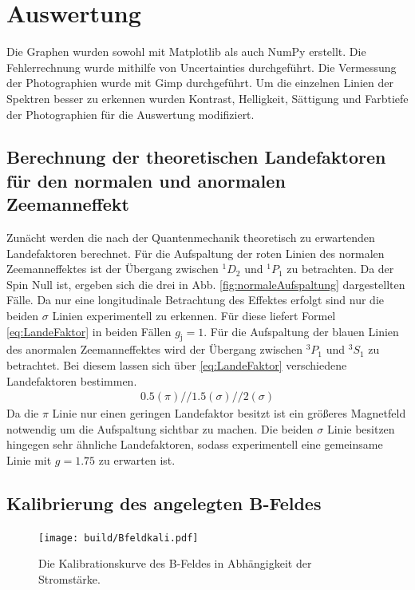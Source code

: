 \section{Auswertung}
\label{sec:Auswertung}
Die Graphen wurden sowohl mit Matplotlib \cite{matplotlib} als auch NumPy \cite{numpy} erstellt. Die
Fehlerrechnung wurde mithilfe von Uncertainties \cite{uncertainties} durchgeführt. Die Vermessung der Photographien wurde mit Gimp durchgeführt. Um die einzelnen Linien der Spektren besser zu erkennen wurden Kontrast, Helligkeit, Sättigung und Farbtiefe der Photographien für die Auswertung modifiziert.%



\subsection{Berechnung der theoretischen Landefaktoren für den normalen und anormalen Zeemanneffekt}
Zunächt werden die nach der Quantenmechanik theoretisch zu erwartenden Landefaktoren berechnet. Für die Aufspaltung der roten Linien des normalen Zeemanneffektes ist der Übergang zwischen $^1 D_2$ und $^1 P_1$ zu betrachten.
 Da der Spin Null ist, ergeben sich die drei in Abb. \ref{fig:normaleAufspaltung} dargestellten Fälle. Da nur eine longitudinale Betrachtung des Effektes erfolgt sind nur die beiden $\sigma$ Linien experimentell zu erkennen. Für diese liefert Formel \eqref{eq:LandeFaktor} in beiden Fällen $g_\text{j} = 1$.
Für die Aufspaltung der blauen Linien des anormalen Zeemanneffektes wird der Übergang zwischen $^3 P_1$ und $^3 S_1$ zu betrachtet. Bei diesem lassen sich über \eqref{eq:LandeFaktor} verschiedene Landefaktoren bestimmen. 
\begin{gather}
	0.5 (\pi)// 
	1.5 (\sigma)//
	2 (\sigma)
\end{gather}
Da die $\pi$ Linie nur einen geringen Landefaktor besitzt ist ein größeres Magnetfeld notwendig um die Aufspaltung sichtbar zu machen. Die beiden $\sigma$ Linie besitzen hingegen sehr ähnliche Landefaktoren, sodass experimentell eine gemeinsame Linie mit $g= 1.75$ zu erwarten ist.

\subsection{Kalibrierung des angelegten B-Feldes}

\begin{figure}
	\centering
	\texttt{[image: build/Bfeldkali.pdf]}
	\caption{Die Kalibrationskurve des B-Feldes in Abhängigkeit der Stromstärke.}
	\label{fig:BvonI}
\end{figure}

